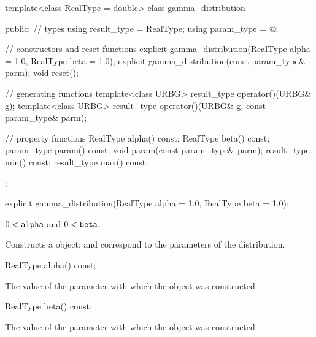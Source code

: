 %
\begin{codeblock}
template<class RealType = double>
  class gamma_distribution {
  public:
    // types
    using result_type = RealType;
    using param_type  = @\unspec@;

    // constructors and reset functions
    explicit gamma_distribution(RealType alpha = 1.0, RealType beta = 1.0);
    explicit gamma_distribution(const param_type& parm);
    void reset();

    // generating functions
    template<class URBG>
      result_type operator()(URBG& g);
    template<class URBG>
      result_type operator()(URBG& g, const param_type& parm);

    // property functions
    RealType alpha() const;
    RealType beta() const;
    param_type param() const;
    void param(const param_type& parm);
    result_type min() const;
    result_type max() const;
  };
\end{codeblock}


%
\begin{itemdecl}
explicit gamma_distribution(RealType alpha = 1.0, RealType beta = 1.0);
\end{itemdecl}

\begin{itemdescr}
\pnum\requires
 $ 0 < \texttt{\protect alpha} $
 and $ 0 < \texttt{\protect beta} $.

\pnum\effects Constructs a  object;
  and 
 correspond to the parameters of the distribution.
\end{itemdescr}

%
\begin{itemdecl}
RealType alpha() const;
\end{itemdecl}

\begin{itemdescr}
\pnum\returns The value of the  parameter
 with which the object was constructed.
\end{itemdescr}

%
\begin{itemdecl}
RealType beta() const;
\end{itemdecl}

\begin{itemdescr}
\pnum\returns The value of the  parameter
 with which the object was constructed.
\end{itemdescr}

